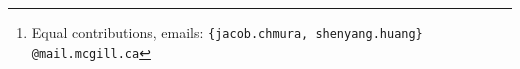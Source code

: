 \author{Jacob Chmura\textsuperscript{1,2}\thanks{Equal contributions, emails: \texttt{\{jacob.chmura, shenyang.huang\} @mail.mcgill.ca} }\quad Shenyang Huang\textsuperscript{3,1,2}\footnotemark[1] \quad Tran Gia Bao Ngo \textsuperscript{4} \quad  Ali Parviz \textsuperscript{1} \\ 
\textbf{Farimah Poursafaei}\textbf{\textsuperscript{1,2}} \quad \textbf{Jure Leskovec}\textbf{\textsuperscript{6,7}} \quad  \textbf{Michael Bronstein}\textbf{\textsuperscript{3,5}} \\
\textbf{Guillaume Rabusseau}\textbf{\textsuperscript{1,8,9}} \quad \textbf{Matthias Fey}\textbf{\textsuperscript{7}} \quad \textbf{Reihaneh Rabbany}\textbf{\textsuperscript{1,2,9}} \\
\textsuperscript{1}Mila - Quebec AI Institute, 
\textsuperscript{2}School of Computer Science, McGill University\\
\textsuperscript{3}University of Oxford,
\textsuperscript{4}Department of computer science, University of Manitoba\\
\textsuperscript{5}AITHYRA,
\textsuperscript{6}Stanford University
\textsuperscript{7}Kumo.AI\\
\textsuperscript{8}DIRO, Université de Montréal,
\textsuperscript{9}CIFAR AI Chair\\
}







